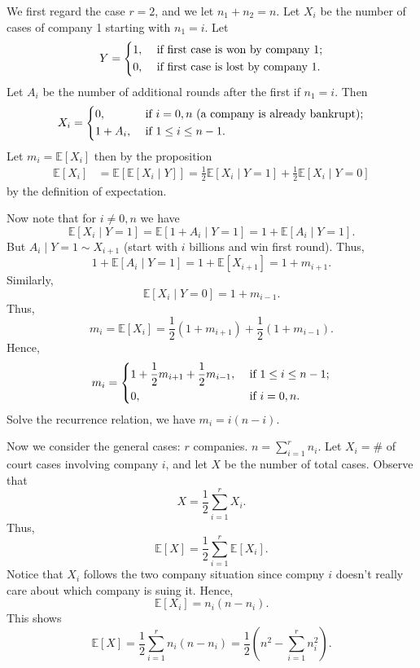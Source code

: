\begin{explanation}
    We first regard the case \(r = 2\), and we let \(n_1 + n_2 = n\). Let \(X_i\) be the number of cases of company 1 starting with \(n_1 = i\). Let 
    \[
        Y = \begin{dcases}
            1, &\text{ if first case is won by company 1}  ;\\
            0, &\text{ if first case is lost by company 1} .
        \end{dcases}
    \]
    Let \(A_i\) be the number of additional rounds after the first if \(n_1 = i\). Then 
    \[
        X_i = \begin{dcases}
            0, &\text{ if } i = 0, n \text{ (a company is already bankrupt)}  ;\\
            1 + A_i, &\text{ if } 1 \le i \le n - 1.
        \end{dcases}
    \]  
    Let \(m_i = \mathbb{E} [X_i]\)  then by the proposition 
    \begin{align*}
        \mathbb{E} [X_i] &= \mathbb{E} \left[ \mathbb{E} [X_i \mid Y] \right] = \frac{1}{2} \mathbb{E} [X_i \mid Y = 1] + \frac{1}{2} \mathbb{E} [X_i \mid Y = 0] 
    \end{align*} 
    by the definition of expectation. 

    Now note that for \(i \neq 0, n\) we have 
    \[
        \mathbb{E} [X_i \mid Y = 1] = \mathbb{E} [1 + A_i \mid Y = 1] = 1 + \mathbb{E} [A_i \mid Y = 1].
    \]
    But \(A_i \mid Y = 1 \sim X_{i + 1}\) (start with \(i\) billions and win first round). Thus,
    \[
        1 + \mathbb{E} [A_i \mid Y = 1] = 1 + \mathbb{E} [X_{i+1}] = 1 + m_{i+1}.
    \] 
    Similarly, 
    \[
        \mathbb{E} [X_i \mid Y = 0] = 1 + m_{i - 1}.
    \]
    Thus,
    \[
        m_i = \mathbb{E} [X_i] = \frac{1}{2} \left( 1 + m_{i + 1} \right) + \frac{1}{2} \left( 1 + m_{i - 1} \right).  
    \]
    Hence, 
    \[
        m_i = \begin{dcases}
            1 + \frac{1}{2} m_{i + 1} + \frac{1}{2} m_{i - 1}, &\text{ if } 1 \le i \le n - 1 ;\\
            0, &\text{ if }  i = 0, n.
        \end{dcases}
    \]
    Solve the recurrence relation, we have \(m_i = i(n - i)\).

    Now we consider the general cases: \(r\) companies. \(n = \sum_{i=1}^r n_i \). Let \(X_i = \#\) of court cases involving company \(i\), and let \(X\) be the number of total cases. Observe that 
    \[
        X = \frac{1}{2} \sum_{i=1}^r X_i. 
    \]      
    Thus,
    \[
        \mathbb{E} [X] = \frac{1}{2} \sum_{i=1}^r \mathbb{E} [X_i]. 
    \]
    Notice that \(X_i\) follows the two company situation since compny \(i\) doesn't really care about which company is suing it. Hence,
    \[
        \mathbb{E} [X_i] = n_i (n - n_i).
    \]  
    This shows 
    \[
        \mathbb{E} [X] = \frac{1}{2} \sum_{i=1}^r n_i (n - n_i) = \frac{1}{2} \left( n^2 - \sum_{i=1}^r n_i^2  \right).  
    \]
\end{explanation}